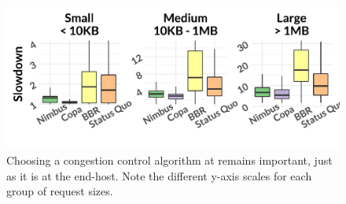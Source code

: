 \begin{figure}[t]
    \centering
\begin{knitrout}
\color{fgcolor}
\includegraphics[width=\maxwidth]{figure/eval_cc-1} 

\end{knitrout}
    \caption{Choosing a congestion control algorithm at \name remains important, just as it is at the end-host. Note the different y-axis scales for each group of request sizes.}
    \label{fig:eval:cc}
\end{figure}
\newcommand{\ccCopaMedian}{1.09\xspace}
\newcommand{\ccNimbusMedian}{1.32\xspace}
\newcommand{\ccBBRMedian}{1.91\xspace}
\newcommand{\ccBaselineMedian}{1.76\xspace}

